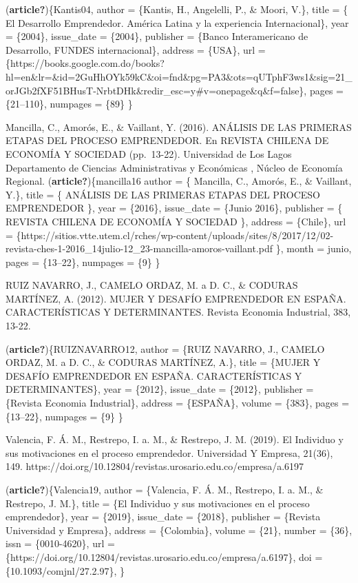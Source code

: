 \documentclass[
  letterpaper,
  DIV=11,
  numbers=noendperiod]{scrreprt}
\begin{document}
(\textbf{article?})\{Kantis04, author = \{Kantis, H., Angelelli, P., \&
Moori, V.\}, title = \{ El Desarrollo Emprendedor. América Latina y la
experiencia Internacional\}, year = \{2004\}, issue\_date = \{2004\},
publisher = \{Banco Interamericano de Desarrollo, FUNDES
internacional\}, address = \{USA\}, url =
\{https://books.google.com.do/books?hl=en\&lr=\&id=2GuHhOYk59kC\&oi=fnd\&pg=PA3\&ots=qUTphF3ws1\&sig=21\_orJGb2fXF51BHusT-NrbtDHk\&redir\_esc=y\#v=onepage\&q\&f=false\},
pages = \{21--110\}, numpages = \{89\} \}

Mancilla, C., Amorós, E., \& Vaillant, Y. (2016). ANÁLISIS DE LAS
PRIMERAS ETAPAS DEL PROCESO EMPRENDEDOR. En REVISTA CHILENA DE ECONOMÍA
Y SOCIEDAD (pp.~13-22). Universidad de Los Lagos Departamento de
Ciencias Administrativas y Económicas , Núcleo de Economía Regional.
(\textbf{article?})\{mancilla16 author = \{ Mancilla, C., Amorós, E., \&
Vaillant, Y.\}, title = \{ ANÁLISIS DE LAS PRIMERAS ETAPAS DEL PROCESO
EMPRENDEDOR \}, year = \{2016\}, issue\_date = \{Junio 2016\}, publisher
= \{ REVISTA CHILENA DE ECONOMÍA Y SOCIEDAD \}, address = \{Chile\}, url
=
\{https://sitios.vtte.utem.cl/rches/wp-content/uploads/sites/8/2017/12/02-revista-ches-1-2016\_14julio-12\_23-mancilla-amoros-vaillant.pdf
\}, month = junio, pages = \{13--22\}, numpages = \{9\} \}

RUIZ NAVARRO, J., CAMELO ORDAZ, M. a D. C., \& CODURAS MARTÍNEZ, A.
(2012). MUJER Y DESAFÍO EMPRENDEDOR EN ESPAÑA. CARACTERÍSTICAS Y
DETERMINANTES. Revista Economia Industrial, 383, 13-22.

(\textbf{article?})\{RUIZNAVARRO12, author = \{RUIZ NAVARRO, J., CAMELO
ORDAZ, M. a D. C., \& CODURAS MARTÍNEZ, A.\}, title = \{MUJER Y DESAFÍO
EMPRENDEDOR EN ESPAÑA. CARACTERÍSTICAS Y DETERMINANTES\}, year =
\{2012\}, issue\_date = \{2012\}, publisher = \{Revista Economia
Industrial\}, address = \{ESPAÑA\}, volume = \{383\}, pages =
\{13--22\}, numpages = \{9\} \}

Valencia, F. Á. M., Restrepo, I. a. M., \& Restrepo, J. M. (2019). El
Individuo y sus motivaciones en el proceso emprendedor. Universidad Y
Empresa, 21(36), 149.
https://doi.org/10.12804/revistas.urosario.edu.co/empresa/a.6197

(\textbf{article?})\{Valencia19, author = \{Valencia, F. Á. M.,
Restrepo, I. a. M., \& Restrepo, J. M.\}, title = \{El Individuo y sus
motivaciones en el proceso emprendedor\}, year = \{2019\}, issue\_date =
\{2018\}, publisher = \{Revista Universidad y Empresa\}, address =
\{Colombia\}, volume = \{21\}, number = \{36\}, issn = \{0010-4620\},
url =
\{https://doi.org/10.12804/revistas.urosario.edu.co/empresa/a.6197\},
doi = \{10.1093/comjnl/27.2.97\}, \}
\end{document}
